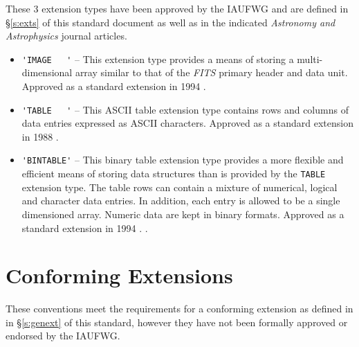 \documentclass[11pt,makeidx]{book}     %
\begin{document}
These 3 extension types have been approved by the IAUFWG 
and are defined in \S\ref{s:exts} of this standard document as well as in
the indicated  {\em Astronomy and Astrophysics} journal articles.

\begin{itemize}
\item
\verb*+'IMAGE   '+ -- 
This extension type provides a means of storing a multi-dimensional array
similar to that of the {\em FITS\/} primary header and 
data unit. Approved as a standard extension in 1994 \cite{ponz94}.  


\item
\verb*+'TABLE   '+ --
This ASCII table extension type contains rows and columns of data 
entries expressed as ASCII characters.  Approved as a standard extension
in 1988 \cite{harten88}.  
    
\item
\verb*+'BINTABLE'+ --
This binary table extension type provides a more flexible and efficient means of storing 
data structures than is provided by the 
{\tt TABLE} extension type. The table rows can contain a mixture of numerical, 
logical and character data entries. In addition, each entry is allowed
to be a single dimensioned array.  Numeric data are kept in binary formats.
Approved as a standard extension in 1994 \cite{cotton95}.  .
\end{itemize}


\section{Conforming Extensions}  

These conventions meet the requirements for a conforming extension as defined in 
in \S\ref{s:genext} of this standard, however they have not been  formally
approved or endorsed by the IAUFWG.
\end{document}
